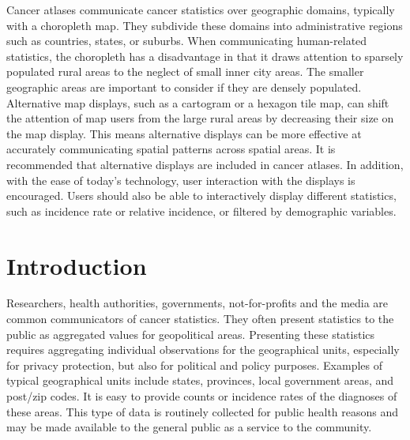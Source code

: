 \documentclass{monashthesis}
\begin{document}
Cancer atlases communicate cancer statistics over geographic domains, typically with a choropleth map. They subdivide these domains into administrative regions such as countries, states, or suburbs. When communicating human-related statistics, the choropleth has a disadvantage in that it draws attention to sparsely populated rural areas to the neglect of small inner city areas. The smaller geographic areas are important to consider if they are densely populated. Alternative map displays, such as a cartogram or a hexagon tile map, can shift the attention of map users from the large rural areas by decreasing their size on the map display. This means alternative displays can be more effective at accurately communicating spatial patterns across spatial areas. It is recommended that alternative displays are included in cancer atlases. In addition, with the ease of today's technology, user interaction with the displays is encouraged. Users should also be able to interactively display different statistics, such as incidence rate or relative incidence, or filtered by demographic variables.

\hypertarget{introduction}{%
\section{Introduction}\label{introduction}}

Researchers, health authorities, governments, not-for-profits and the media are common communicators of cancer statistics. They often present statistics to the public as aggregated values for geopolitical areas. Presenting these statistics requires aggregating individual observations for the geographical units, especially for privacy protection, but also for political and policy purposes. Examples of typical geographical units include states, provinces, local government areas, and post/zip codes. It is easy to provide counts or incidence rates of the diagnoses of these areas. This type of data is routinely collected for public health reasons and may be made available to the general public as a service to the community.
\end{document}

